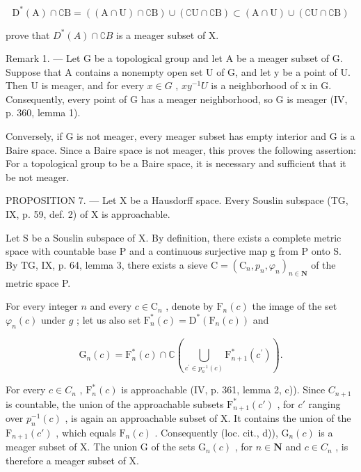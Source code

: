 \[
\mathrm{D} ^ {*} (\mathrm{A}) \cap \complement \mathrm{B} = ((\mathrm{A} \cap \mathrm{U}) \cap \complement \mathrm{B}) \cup (\complement \mathrm{U} \cap \complement \mathrm{B}) \subset (\mathrm{A} \cap \mathrm{U}) \cup (\complement \mathrm{U} \cap \complement \mathrm{B})
\]

prove that \(D^{*}(A) \cap \complement B\) is a meager subset of X.

Remark 1. --- Let G be a topological group and let A be a meager subset of G. Suppose that A contains a nonempty open set U of G, and let y be a point of U. Then U is meager, and for every \(x \in G\) , \(xy^{-1}U\) is a neighborhood of x in G. Consequently, every point of G has a meager neighborhood, so G is meager (IV, p. 360, lemma 1).

Conversely, if G is not meager, every meager subset has empty interior and G is a Baire space. Since a Baire space is not meager, this proves the following assertion: For a topological group to be a Baire space, it is necessary and sufficient that it be not meager.

PROPOSITION 7. --- Let X be a Hausdorff space. Every Souslin subspace (TG, IX, p. 59, def. 2) of X is approachable.

Let S be a Souslin subspace of X. By definition, there exists a complete metric space with countable base P and a continuous surjective map g from P onto S. By TG, IX, p. 64, lemma 3, there exists a sieve \(\mathrm{C} = (\mathrm{C}_{n}, p_{n}, \varphi_{n})_{n \in \mathbf{N}}\) of the metric space P.

For every integer \(n\) and every \(c \in \mathrm{C}_n\) , denote by \(\mathrm{F}_n(c)\) the image of the set \(\varphi_n(c)\) under \(g\) ; let us also set \(\mathrm{F}_n^*(c) = \mathrm{D}^*(\mathrm{F}_n(c))\) and

\[
\mathrm{G} _ {n} (c) = \mathrm{F} _ {n} ^ {*} (c) \cap \mathbb {C} \left(\bigcup_ {c ^ {\prime} \in p _ {n} ^ {- 1} (c)} \mathrm{F} _ {n + 1} ^ {*} (c ^ {\prime})\right).\tag{1}
\]

For every \(c \in C_{n}\) , \(\mathrm{F}_{n}^{*}(c)\) is approachable (IV, p. 361, lemma 2, c)). Since \(C_{n+1}\) is countable, the union of the approachable subsets \(\mathrm{F}_{n+1}^{*}(c')\) , for \(c'\) ranging over \(p_{n}^{-1}(c)\) , is again an approachable subset of X. It contains the union of the \(\mathrm{F}_{n+1}(c')\) , which equals \(\mathrm{F}_{n}(c)\) . Consequently (loc. cit., d)), \(\mathrm{G}_{n}(c)\) is a meager subset of X. The union G of the sets \(\mathrm{G}_{n}(c)\) , for \(n \in \mathbf{N}\) and \(c \in C_{n}\) , is therefore a meager subset of X.

